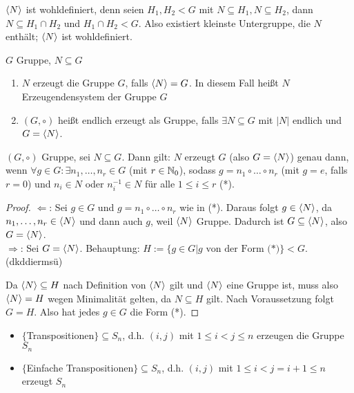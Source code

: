 \documentclass[12pt,a4paper]{scrartcl}
\begin{document}
\begin{bem}
	$\langle N\rangle$ ist wohldefiniert, denn seien $H_1, H_2<G$ mit $N\subseteq H_1, N\subseteq H_2$, dann $N\subseteq H_1\cap H_2$ und $H_1\cap H_2<G$. Also existiert kleinste Untergruppe, die $N$ enthält; $\langle N\rangle$ ist wohldefiniert.
\end{bem}

\begin{defi}
	$G$ Gruppe, $N\subseteq G$
	\begin{enumerate}
		\item $N$ erzeugt die Gruppe $G$, falls $\langle N\rangle = G$. In diesem Fall heißt $N$ Erzeugendensystem der Gruppe $G$
		\item $(G,\circ)$ heißt endlich erzeugt als Gruppe, falls $\exists N\subseteq G$ mit $|N|$ endlich und $G = \langle N\rangle$.
	\end{enumerate}
\end{defi}

\begin{bem}
	$(G,\circ)$ Gruppe, sei $N\subseteq G$. Dann gilt: $N$ erzeugt $G$ (also $G = \langle N\rangle$) genau dann, wenn $\forall g\in G : \exists n_1,\dots,n_r\in G$ (mit $r\in \mathbb N_0$), sodass $g = n_1\circ \dots \circ n_r$ (mit $g=e$, falls $r=0$) und $n_i\in N$ oder $n_i^{-1}\in N$ für alle $1\leq i\leq r$ (*).
\end{bem}

\begin{proof}
	\glqq$\Leftarrow$\grqq: Sei $g\in G$ und $g = n_1\circ\dots \circ n_r$ wie in (*). Daraus folgt $g\in \langle N\rangle$, da $n_1,\dots,n_r\in \langle N\rangle$ und dann auch $g$, weil $\langle N\rangle$ Gruppe. Dadurch ist $G\subseteq \langle N\rangle$, also $G = \langle N\rangle$.\\
	\glqq$\Rightarrow$\grqq: Sei $G = \langle N\rangle$. Behauptung: $H:=\{g\in G| g \mbox{ von der Form (*)}\}<G$. (dkddiermsü)
	
	Da $\langle N\rangle\subseteq H$ nach Definition von $\langle N\rangle$ gilt und $\langle N\rangle$ eine Gruppe ist, muss also $\langle N\rangle = H$ wegen Minimalität gelten, da $N\subseteq H$ gilt. Nach Voraussetzung folgt $G = H$. Also hat jedes $g\in G$ die Form (*).
\end{proof}

\begin{bsp}
	\leavevmode
	\begin{itemize}
		\item $\{$Transpositionen$\}\subseteq S_n$, d.h. $(i,j)$ mit $1\leq i<j\leq n$ erzeugen die Gruppe $S_n$
		\item $\{$Einfache Transpositionen$\}\subseteq S_n$, d.h. $(i,j)$ mit $1\leq i<j=i+1\leq n$ erzeugt $S_n$
	\end{itemize}
	
\end{bsp}
\end{document}

